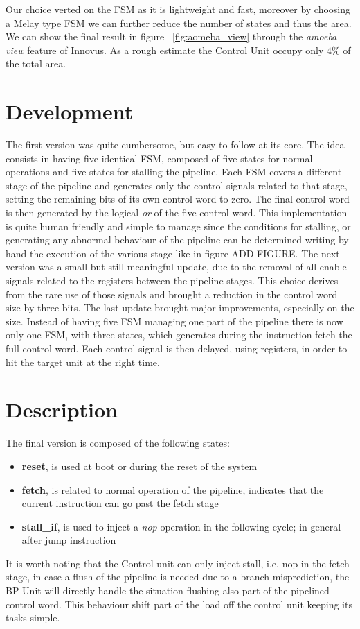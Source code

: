 Our choice verted on the FSM as it is lightweight and fast, moreover by choosing
a Melay type FSM we can further reduce the number of states and thus the area.
We can show the final result in figure ~\ref{fig:aomeba_view} through the 
\textit{amoeba view} feature of Innovus. As a rough estimate the Control Unit 
occupy only $4 \%$ of the total area.

\section{Development}
The first version was quite cumbersome, but easy to follow at its core. The idea
consists in having five identical FSM, composed of five states 
for normal operations and five states for stalling the pipeline. Each FSM
covers a different stage of the pipeline and generates only the control signals
related to that stage, setting the remaining bits of its own control word to
zero. The final control word is then generated by the logical \textit{or} of 
the five control word. This implementation is quite human friendly and simple 
to manage since the conditions for stalling, or generating any abnormal 
behaviour of the pipeline can be determined writing by hand the execution 
of the various stage like in figure ADD FIGURE.
The next version was a small but still meaningful update, due to the removal 
of all enable signals related to the registers between the pipeline stages.
This choice derives from the rare use of those signals and brought a reduction
in the control word size by three bits.
The last update brought major improvements, especially on the size.
Instead of having five FSM managing one part of the pipeline there is now only 
one FSM, with three states, which generates during the instruction fetch the 
full control word. Each control signal is then delayed, using registers, in 
order to hit the target unit at the right time. 

\section{Description} 
The final version is composed of the following states:

\begin{itemize}
	\item \textbf{reset}, is used at boot or during the reset of the system 
	\item \textbf{fetch}, is related to normal operation of the pipeline,
	      indicates that the current instruction can go past the fetch stage
	\item \textbf{stall\_if}, is used to inject a \textit{nop} operation in the
	      following cycle; in general after jump instruction
\end{itemize} 
It is worth noting that the Control unit can only inject stall, i.e. nop in the
fetch stage, in case a flush of the pipeline is needed due to a branch
misprediction, the BP Unit will directly handle the situation flushing also part
of the pipelined control word. This behaviour shift part of the load off the 
control unit keeping its tasks simple.

